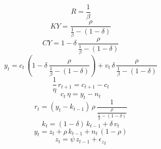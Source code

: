 \begin{dmath*}
R = \frac{1}{{{\beta}}}
\end{dmath*}
\begin{dmath*}
KY = \frac{{{\rho}}}{\frac{1}{{{\beta}}}-\left(1-{{\delta}}\right)}
\end{dmath*}
\begin{dmath*}
CY = 1-{{\delta}}\, \frac{{{\rho}}}{\frac{1}{{{\beta}}}-\left(1-{{\delta}}\right)}
\end{dmath*}
\begin{dmath}
{{y}}_{t}={{c}}_{t}\, \left(1-{{\delta}}\, \frac{{{\rho}}}{\frac{1}{{{\beta}}}-\left(1-{{\delta}}\right)}\right)+{{v}}_{t}\, {{\delta}}\, \frac{{{\rho}}}{\frac{1}{{{\beta}}}-\left(1-{{\delta}}\right)}
\end{dmath}
\begin{dmath}
\frac{1}{{{\eta}}}\, {{r}}_{t+1}={{c}}_{t+1}-{{c}}_{t}
\end{dmath}
\begin{dmath}
{{c}}_{t}\, {{\eta}}={{y}}_{t}-{{n}}_{t}
\end{dmath}
\begin{dmath}
{{r}}_{t}=\left({{y}}_{t}-{{k}}_{t-1}\right)\, {{\rho}}\, \frac{1}{\frac{{{\rho}}}{\frac{1}{{{\beta}}}-\left(1-{{\delta}}\right)}}
\end{dmath}
\begin{dmath}
{{k}}_{t}=\left(1-{{\delta}}\right)\, {{k}}_{t-1}+{{\delta}}\, {{v}}_{t}
\end{dmath}
\begin{dmath}
{{y}}_{t}={{z}}_{t}+{{\rho}}\, {{k}}_{t-1}+{{n}}_{t}\, \left(1-{{\rho}}\right)
\end{dmath}
\begin{dmath}
{{z}}_{t}={{\psi}}\, {{z}}_{t-1}+{{\epsilon_z}}_{t}
\end{dmath}
